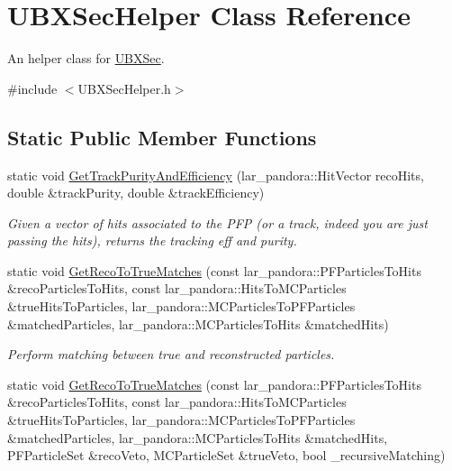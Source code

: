 \hypertarget{classUBXSecHelper}{\section{\-U\-B\-X\-Sec\-Helper \-Class \-Reference}
\label{classUBXSecHelper}
}


\-An helper class for \hyperlink{classUBXSec}{\-U\-B\-X\-Sec}.  




{\ttfamily \#include $<$\-U\-B\-X\-Sec\-Helper.\-h$>$}

\subsection*{\-Static \-Public \-Member \-Functions}
\begin{DoxyCompactItemize}
\item 
static void \hyperlink{classUBXSecHelper_a43250b48882308e09d5099186dbb1b01}{\-Get\-Track\-Purity\-And\-Efficiency} (lar\-\_\-pandora\-::\-Hit\-Vector reco\-Hits, double \&track\-Purity, double \&track\-Efficiency)
\begin{DoxyCompactList}\small\item\em \-Given a vector of hits associated to the \-P\-F\-P (or a track, indeed you are just passing the hits), returns the tracking eff and purity. \end{DoxyCompactList}\item 
static void \hyperlink{classUBXSecHelper_a0708dbe6fb5f3ea0f200362887473e36}{\-Get\-Reco\-To\-True\-Matches} (const lar\-\_\-pandora\-::\-P\-F\-Particles\-To\-Hits \&reco\-Particles\-To\-Hits, const lar\-\_\-pandora\-::\-Hits\-To\-M\-C\-Particles \&true\-Hits\-To\-Particles, lar\-\_\-pandora\-::\-M\-C\-Particles\-To\-P\-F\-Particles \&matched\-Particles, lar\-\_\-pandora\-::\-M\-C\-Particles\-To\-Hits \&matched\-Hits)
\begin{DoxyCompactList}\small\item\em \-Perform matching between true and reconstructed particles. \end{DoxyCompactList}\item 
static void \hyperlink{classUBXSecHelper_a111c32be3cab634ffacbfa03e7ea789b}{\-Get\-Reco\-To\-True\-Matches} (const lar\-\_\-pandora\-::\-P\-F\-Particles\-To\-Hits \&reco\-Particles\-To\-Hits, const lar\-\_\-pandora\-::\-Hits\-To\-M\-C\-Particles \&true\-Hits\-To\-Particles, lar\-\_\-pandora\-::\-M\-C\-Particles\-To\-P\-F\-Particles \&matched\-Particles, lar\-\_\-pandora\-::\-M\-C\-Particles\-To\-Hits \&matched\-Hits, \-P\-F\-Particle\-Set \&reco\-Veto, \-M\-C\-Particle\-Set \&true\-Veto, bool \-\_\-recursive\-Matching)

\end{DoxyCompactItemize}
